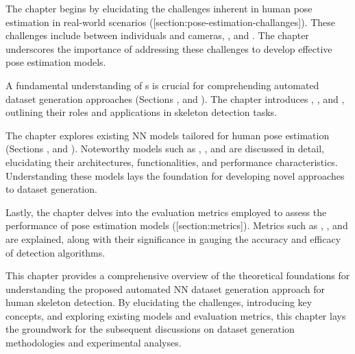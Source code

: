 
The chapter begins by elucidating the challenges inherent in human pose estimation in real-world scenarios ([section:pose-estimation-challanges]). These challenges include  between individuals and cameras, , and . The chapter underscores the importance of addressing these challenges to develop effective pose estimation models.


A fundamental understanding of \NN\-s is crucial for comprehending automated dataset generation approaches (Sections \in[section:nn],  and ). The chapter introduces , , and , outlining their roles and applications in skeleton detection tasks.


The chapter explores existing NN models tailored for human pose estimation (Sections ,  and ). Noteworthy models such as , , and  are discussed in detail, elucidating their architectures, functionalities, and performance characteristics. Understanding these models lays the foundation for developing novel approaches to dataset generation.


Lastly, the chapter delves into the evaluation metrics employed to assess the performance of pose estimation models ([section:metrics]). Metrics such as , , and  are explained, along with their significance in gauging the accuracy and efficacy of detection algorithms.

This chapter provides a comprehensive overview of the theoretical foundations for understanding the proposed automated NN dataset generation ap\-proach for human skeleton detection. By elucidating the challenges, introducing key concepts, and exploring existing models and evaluation metrics, this chapter lays the groundwork for the subsequent discussions on dataset generation methodologies and experimental analyses.